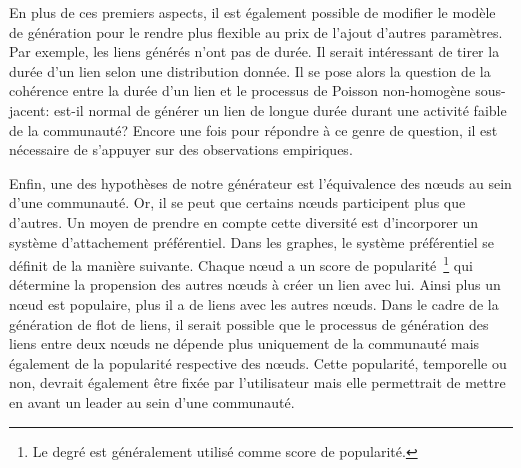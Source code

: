 En plus de ces premiers aspects, il est également possible de modifier le modèle de génération pour le rendre plus flexible au prix de l'ajout d'autres paramètres.
Par exemple, les liens générés n'ont pas de durée.
Il serait intéressant de tirer la durée d'un lien selon une distribution donnée.
Il se pose alors la question de la cohérence entre la durée d'un lien et le processus de Poisson non-homogène sous-jacent: est-il normal de générer un lien de longue durée durant une activité faible de la communauté?
Encore une fois pour répondre à ce genre de question, il est nécessaire de s'appuyer sur des observations empiriques.

Enfin, une des hypothèses de notre générateur est l'équivalence des n\oe uds au sein d'une communauté.
Or, il se peut que certains n\oe uds participent plus que d'autres.
Un moyen de prendre en compte cette diversité est d'incorporer un système d'attachement préférentiel.
Dans les graphes, le système préférentiel se définit de la manière suivante.
Chaque n\oe ud a un score de popularité~\footnote{Le degré est généralement utilisé comme score de popularité.} qui détermine la propension des autres n\oe uds à créer un lien avec lui.
Ainsi plus un n\oe ud est populaire, plus il a de liens avec les autres n\oe uds.
Dans le cadre de la génération de flot de liens, il serait possible que le processus de génération des liens entre deux n\oe uds ne dépende plus uniquement de la communauté mais également de la popularité respective des n\oe uds.
Cette popularité, temporelle ou non, devrait également être fixée par l'utilisateur mais elle permettrait de mettre en avant un leader au sein d'une communauté.





